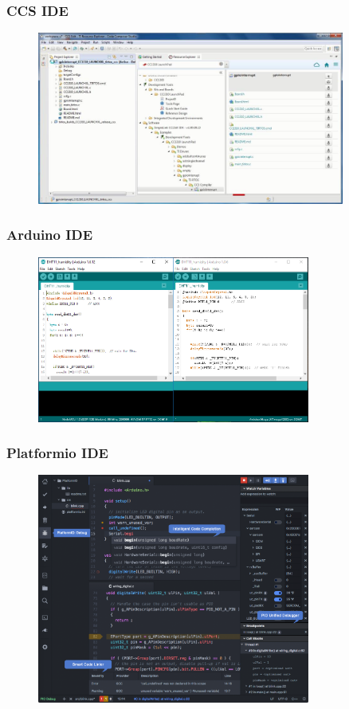 \begin{frame}
	\frametitle{CCS IDE}
	\begin{figure}[htbp]
		\centering
		\includegraphics[width=0.9\textwidth]{images/ccs}
	\end{figure}
\end{frame}

\begin{frame}
	\frametitle{Arduino IDE}
	\begin{figure}[htbp]
		\centering
		\includegraphics[width=0.8\textwidth]{images/arduino}
	\end{figure}
\end{frame}

\begin{frame}
	\frametitle{Platformio IDE}
	\begin{figure}[htbp]
		\centering
		\includegraphics[width=0.8\textwidth]{images/platformio}
	\end{figure}
\end{frame}
